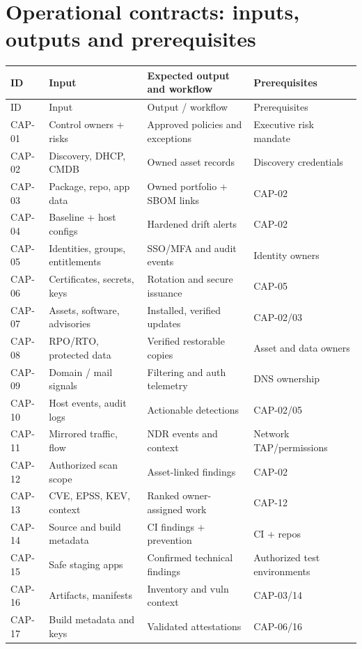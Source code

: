 \documentclass[11pt,oneside]{report}
\begin{document}
\section{Operational contracts: inputs, outputs and prerequisites}
\footnotesize
\begin{longtable}{P{0.10\textwidth}P{0.26\textwidth}P{0.27\textwidth}P{0.25\textwidth}}
\toprule ID & Input & Expected output and workflow & Prerequisites\\\midrule\endfirsthead
\toprule ID & Input & Output / workflow & Prerequisites\\\midrule\endhead

CAP-01 & Control owners + risks & Approved policies and exceptions & Executive risk mandate \\
CAP-02 & Discovery, DHCP, CMDB & Owned asset records & Discovery credentials \\
CAP-03 & Package, repo, app data & Owned portfolio + SBOM links & CAP-02 \\
CAP-04 & Baseline + host configs & Hardened drift alerts & CAP-02 \\
CAP-05 & Identities, groups, entitlements & SSO/MFA and audit events & Identity owners \\
CAP-06 & Certificates, secrets, keys & Rotation and secure issuance & CAP-05 \\
CAP-07 & Assets, software, advisories & Installed, verified updates & CAP-02/03 \\
CAP-08 & RPO/RTO, protected data & Verified restorable copies & Asset and data owners \\
CAP-09 & Domain / mail signals & Filtering and auth telemetry & DNS ownership \\
CAP-10 & Host events, audit logs & Actionable detections & CAP-02/05 \\
CAP-11 & Mirrored traffic, flow & NDR events and context & Network TAP/permissions \\
CAP-12 & Authorized scan scope & Asset-linked findings & CAP-02 \\
CAP-13 & CVE, EPSS, KEV, context & Ranked owner-assigned work & CAP-12 \\
CAP-14 & Source and build metadata & CI findings + prevention & CI + repos \\
CAP-15 & Safe staging apps & Confirmed technical findings & Authorized test environments \\
CAP-16 & Artifacts, manifests & Inventory and vuln context & CAP-03/14 \\
CAP-17 & Build metadata and keys & Validated attestations & CAP-06/16 \\

\end{longtable}
\end{document}
